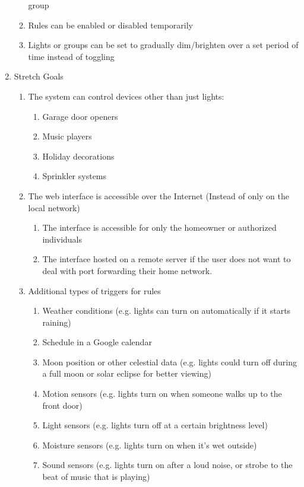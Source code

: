 \documentclass[oneside,openright]{book}
\begin{document}
\begin{enumerate}
\begin{enumerate}
            group
        \item Rules can be enabled or disabled temporarily
        \item Lights or groups can be set to gradually dim/brighten over a set
            period of time instead of toggling
    \end{enumerate}
    \item Stretch Goals
    \begin{enumerate}
        \item The system can control devices other than just lights:
        \begin{enumerate}
            \item Garage door openers
            \item Music players
            \item Holiday decorations
            \item Sprinkler systems
        \end{enumerate}
        \item The web interface is accessible over the Internet (Instead of
            only on the local network)
        \begin{enumerate}
            \item The interface is accessible for only the homeowner or
                authorized individuals
            \item The interface hosted on a remote server if the user does not
                want to deal with port forwarding their home network.
        \end{enumerate}
        \item Additional types of triggers for rules
        \begin{enumerate}
            \item Weather conditions (e.g. lights can turn on automatically if
                it starts raining)
            \item Schedule in a Google calendar
            \item Moon position or other celestial data (e.g. lights could turn
                off during a full moon or solar eclipse for better viewing)
            \item Motion sensors (e.g. lights turn on when someone walks up to
                the front door)
            \item Light sensors (e.g. lights turn off at a certain brightness
                level)
            \item Moisture sensors (e.g. lights turn on when it's wet outside)
            \item Sound sensors (e.g. lights turn on after a loud noise, or
                strobe to the beat of music that is playing)
        \end{enumerate}
    \end{enumerate}
\end{enumerate}
\end{document}
